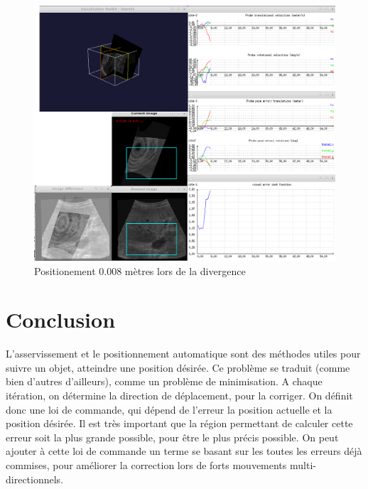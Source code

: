 \documentclass[a4paper,11pt]{article}
\begin{document}
\begin{figure}[H]
    \centering
    \includegraphics[width=0.5\textheight]{./images/q13_0,008_end.png}
    \caption{ Positionement 0.008 m\`etres lors de la divergence }
    \label{q13_4}
\end{figure}

\section{Conclusion}
L'asservissement et le positionnement automatique sont des m\'ethodes utiles pour suivre un objet, atteindre une position d\'esir\'ee. Ce probl\`eme se traduit (comme bien d'autres d'ailleurs), comme un probl\`eme de minimisation. A chaque it\'eration, on d\'etermine la direction de d\'eplacement, pour la corriger. On d\'efinit donc une loi de commande, qui d\'epend de l'erreur la position actuelle et la position d\'esir\'ee. Il est tr\`es important que la r\'egion permettant de calculer cette erreur soit la plus grande possible, pour \^etre le plus pr\'ecis possible. On peut ajouter \`a cette loi de commande un terme se basant sur les toutes les erreurs d\'ej\`a commises, pour am\'eliorer la correction lors de forts mouvements multi-directionnels.
\end{document}
